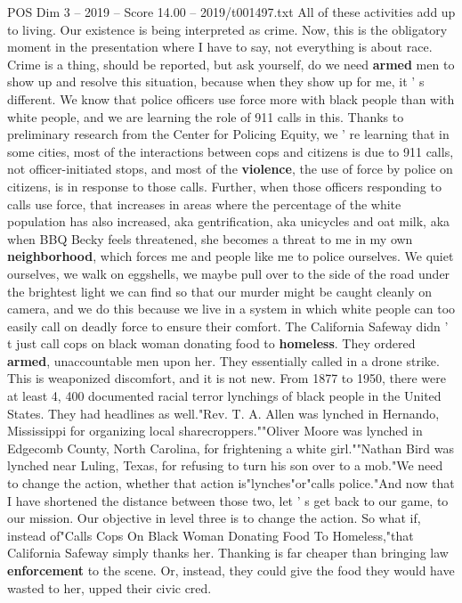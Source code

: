 \begin{textsample}{POS Dim 3 – 2019 – Score 14.00 – 2019/t001497.txt}
All of these activities add up to living.
Our existence is being interpreted as crime.
Now, this is the obligatory moment in the presentation where I have to say, not everything is about race.
Crime is a thing, should be reported, but ask yourself, do we need \textbf{armed} men to show up and resolve this situation, because when they show up for me, it ' s different.
We know that police officers use force more with black people than with white people, and we are learning the role of 911 calls in this.
Thanks to preliminary research from the Center for Policing Equity, we ' re learning that in some cities, most of the interactions between cops and citizens is due to 911 calls, not officer-initiated stops, and most of the \textbf{violence}, the use of force by police on citizens, is in response to those calls.
Further, when those officers responding to calls use force, that increases in areas where the percentage of the white population has also increased, aka gentrification, aka unicycles and oat milk, aka when BBQ Becky feels threatened, she becomes a threat to me in my own \textbf{neighborhood}, which forces me and people like me to police ourselves.
We quiet ourselves, we walk on eggshells, we maybe pull over to the side of the road under the brightest light we can find so that our murder might be caught cleanly on camera, and we do this because we live in a system in which white people can too easily call on deadly force to ensure their comfort.
The California Safeway didn ' t just call cops on black woman donating food to \textbf{homeless}.
They ordered \textbf{armed}, unaccountable men upon her.
They essentially called in a drone strike.
This is weaponized discomfort, and it is not new.
From 1877 to 1950, there were at least 4, 400 documented racial terror lynchings of black people in the United States.
They had headlines as well."Rev.
T.
A.
Allen was lynched in Hernando, Mississippi for organizing local sharecroppers.""Oliver Moore was lynched in Edgecomb County, North Carolina, for frightening a white girl.""Nathan Bird was lynched near Luling, Texas, for refusing to turn his son over to a mob."We need to change the action, whether that action is"lynches"or"calls police."And now that I have shortened the distance between those two, let ' s get back to our game, to our mission.
Our objective in level three is to change the action.
So what if, instead of"Calls Cops On Black Woman Donating Food To Homeless,"that California Safeway simply thanks her.
Thanking is far cheaper than bringing law \textbf{enforcement} to the scene.
Or, instead, they could give the food they would have wasted to her, upped their civic cred.

\end{textsample}
